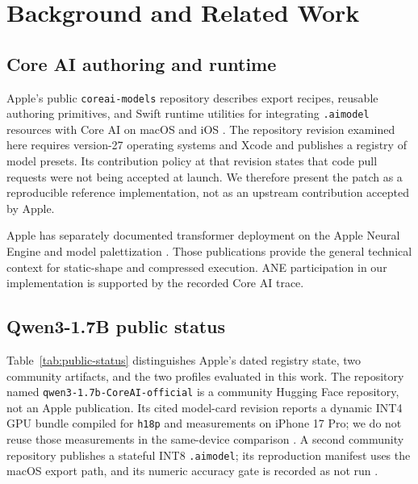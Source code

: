 \documentclass[10pt]{article}
\DeclareRobustCommand{\evidence}[1]{}
\DeclareRobustCommand{\artifact}[1]{\nolinkurl{#1}}
\begin{document}
\section{Background and Related Work}

\subsection{Core AI authoring and runtime}

Apple's public \artifact{coreai-models} repository describes export recipes, reusable authoring primitives, and Swift runtime utilities for integrating \artifact{.aimodel} resources with Core AI on macOS and iOS \citep{appleCoreAIModels2026}.\evidence{CL-26} The repository revision examined here requires version-27 operating systems and Xcode and publishes a registry of model presets.\evidence{CL-26} Its contribution policy at that revision states that code pull requests were not being accepted at launch. We therefore present the patch as a reproducible reference implementation, not as an upstream contribution accepted by Apple.\evidence{CL-26}

Apple has separately documented transformer deployment on the Apple Neural Engine and model palettization \citep{appleANETransformers2022,applePalettization2026}. Those publications provide the general technical context for static-shape and compressed execution. ANE participation in our implementation is supported by the recorded Core AI trace.\evidence{CL-09}

\subsection{Qwen3-1.7B public status}

Table~\ref{tab:public-status} distinguishes Apple's dated registry state, two community artifacts, and the two profiles evaluated in this work. The repository named \artifact{qwen3-1.7b-CoreAI-official} is a community Hugging Face repository, not an Apple publication. Its cited model-card revision reports a dynamic INT4 GPU bundle compiled for \artifact{h18p} and measurements on iPhone 17 Pro; we do not reuse those measurements in the same-device comparison \citep{mlboydaisukeCoreAI2026}.\evidence{CL-24} A second community repository publishes a stateful INT8 \artifact{.aimodel}; its reproduction manifest uses the macOS export path, and its numeric accuracy gate is recorded as not run \citep{kevinqzCoreAI2026}.\evidence{CL-25}


\end{document}
